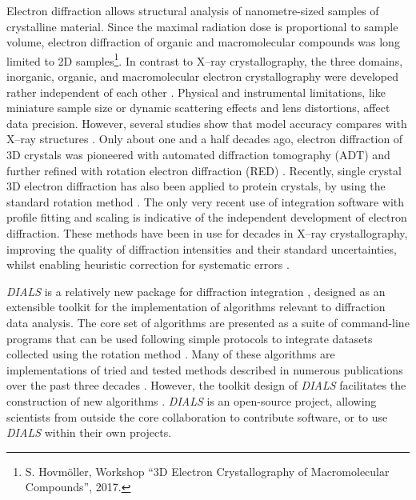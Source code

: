 \documentclass[preprint]{iucr}
\newcommand{\dials}{\emph{DIALS}\xspace}
\begin{document}
Electron diffraction allows structural analysis of nanometre-sized samples of
crystalline material. Since the maximal radiation dose is proportional to
sample volume, electron diffraction of organic and macromolecular compounds was
long limited to 2D samples\footnote{S. Hovm{\"o}ller, Workshop ``3D Electron
Crystallography of Macromolecular Compounds'', 2017.}\cite{unwin-henderson:1975}.
In contrast to X--ray crystallography, the three domains, inorganic, organic,
and macromolecular electron crystallography were developed rather independent
of each other
\cite{vainshtein:1964,dorset:1995,adt:2007,glaeser_downing_derosier:2007,zou:2011}.
Physical and instrumental limitations, like miniature sample size or dynamic
scattering effects and lens distortions, affect data precision. However,
several studies show that model accuracy compares with X--ray structures
\cite{weirich:1996,zeo_adt:2014,dorset:1992,palatinus:2017}. Only about one and
a half decades ago, electron diffraction of 3D crystals was pioneered with
automated diffraction tomography (ADT) and further refined with rotation electron
diffraction (RED) \cite{adt:2007,rotmethod_e:2010,gemmi_adt:2015}. Recently,
single crystal 3D electron diffraction has also been applied to protein
crystals, by using the standard rotation method
\cite{Arndt1977,Nederlof2013,Hattne2015,Yonekura2015,Clabbers2017}. The only
very recent use of integration software with profile fitting and scaling is
indicative of the
independent development of electron diffraction. These methods have been in use
for decades in X--ray crystallography, improving the quality of diffraction
intensities and their standard uncertainties, whilst enabling heuristic
correction for systematic errors \cite{pflugrath:1999,leslie1999integration}.

\dials is a relatively new package for diffraction integration
\cite{Winter2018}, designed as an extensible toolkit for the implementation of
algorithms relevant to diffraction data analysis. The core set of algorithms
are presented as a suite of command-line programs that can be used following
simple protocols to integrate datasets collected using the rotation method
\cite{Arndt1977}. Many of these algorithms are implementations of tried and
tested methods described in numerous publications over the past three decades
\cite{leslie1999integration,LURE1986phase1and2,LURE1986phase3,kabsch2010xds}.
However, the toolkit design of \dials facilitates the construction of new
algorithms \cite{Gildea2014,Parkhurst2016,Parkhurst2017}. \dials is an
open-source project, allowing scientists from outside the core collaboration to
contribute software, or to use \dials within their own projects.
\end{document}
